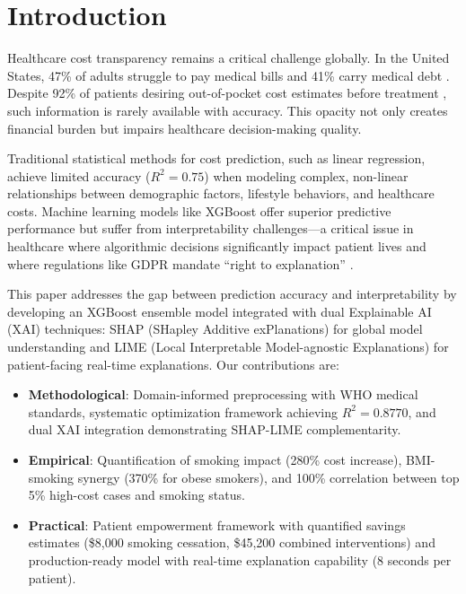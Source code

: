 \documentclass[conference]{IEEEtran}
\begin{document}
\section{Introduction}
Healthcare cost transparency remains a critical challenge globally. In the United States, 47\% of adults struggle to pay medical bills and 41\% carry medical debt \cite{kff2024}. Despite 92\% of patients desiring out-of-pocket cost estimates before treatment \cite{sagi2024}, such information is rarely available with accuracy. This opacity not only creates financial burden but impairs healthcare decision-making quality.

Traditional statistical methods for cost prediction, such as linear regression, achieve limited accuracy ($R^2 = 0.75$) \cite{susilo2024} when modeling complex, non-linear relationships between demographic factors, lifestyle behaviors, and healthcare costs. Machine learning models like XGBoost offer superior predictive performance but suffer from interpretability challenges---a critical issue in healthcare where algorithmic decisions significantly impact patient lives and where regulations like GDPR mandate ``right to explanation'' \cite{lundberg2017}.

This paper addresses the gap between prediction accuracy and interpretability by developing an XGBoost ensemble model integrated with dual Explainable AI (XAI) techniques: SHAP (SHapley Additive exPlanations) for global model understanding and LIME (Local Interpretable Model-agnostic Explanations) for patient-facing real-time explanations. Our contributions are:

\begin{itemize}
\item \textbf{Methodological}: Domain-informed preprocessing with WHO medical standards, systematic optimization framework achieving $R^2 = 0.8770$, and dual XAI integration demonstrating SHAP-LIME complementarity.

\item \textbf{Empirical}: Quantification of smoking impact (280\% cost increase), BMI-smoking synergy (370\% for obese smokers), and 100\% correlation between top 5\% high-cost cases and smoking status.

\item \textbf{Practical}: Patient empowerment framework with quantified savings estimates (\$8,000 smoking cessation, \$45,200 combined interventions) and production-ready model with real-time explanation capability (8 seconds per patient).
\end{itemize}
\end{document}
